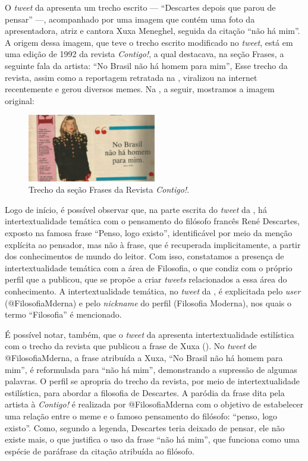 \documentclass{textolivre}
\begin{document}
O \textit{tweet} da  apresenta um trecho escrito — “Descartes depois que parou de pensar” —, acompanhado por uma imagem que contém uma foto da apresentadora, atriz e cantora Xuxa Meneghel, seguida da citação “não há mim”. A origem dessa imagem, que teve o trecho escrito modificado no \textit{tweet}, está em uma edição de 1992 da revista \textit{Contigo!}, a qual destacava, na seção Frases, a seguinte fala da artista: “No Brasil não há homem para mim”, Esse trecho da revista, assim como a reportagem retratada na , viralizou na internet recentemente e gerou diversos memes. Na , a seguir, mostramos a imagem original: 

\begin{figure}[htbp]
 \centering
 \includegraphics[width=0.5\textwidth]{Fig5.png}
 \caption{Trecho da seção Frases da Revista \textit{Contigo!}.}
 \label{fig05}
\end{figure}

Logo de início, é possível observar que, na parte escrita do \textit{tweet} da , há intertextualidade temática com o pensamento do filósofo francês René Descartes, exposto na famosa frase “Penso, logo existo”, identificável por meio da menção explícita ao pensador, mas não à frase, que é recuperada implicitamente, a partir dos conhecimentos de mundo do leitor. Com isso, constatamos a presença de intertextualidade temática com a área de Filosofia, o que condiz com o próprio perfil que a publicou, que se propõe a criar \textit{tweets} relacionados a essa área do conhecimento. A intertextualidade temática, no \textit{tweet} da , é explicitada pelo \textit{user} (@FilosofiaMderna) e pelo \textit{nickname} do perfil (Filosofia Moderna), nos quais o termo “Filosofia” é mencionado.

É possível notar, também, que o \textit{tweet} da  apresenta intertextualidade estilística com o trecho da revista que publicou a frase de Xuxa (). No \textit{tweet} de @FilosofiaMderna, a frase atribuída a Xuxa, “No Brasil não há homem para mim”, é reformulada para “não há mim”, demonstrando a supressão de algumas palavras. O perfil se apropria do trecho da revista, por meio de intertextualidade estilística, para abordar a filosofia de Descartes. A paródia da frase dita pela artista à \textit{Contigo!} é realizada por @FilosofiaMderna com o objetivo de estabelecer uma relação entre o meme e o famoso pensamento do filósofo: “penso, logo existo”. Como, segundo a legenda, Descartes teria deixado de pensar, ele não existe mais, o que justifica o uso da frase “não há mim”, que funciona como uma espécie de paráfrase da citação atribuída ao filósofo.
\end{document}
